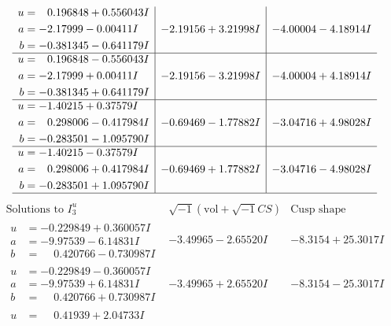 \documentclass[1p]{elsarticle_modified}
\theoremstyle{definition}
\newcommand{\I}{\sqrt{-1}}
\begin{document}
$$\begin{array}{c|c|c}
\begin{aligned}
u &= \phantom{-}0.196848 + 0.556043 I \\
a &= -2.17999 - 0.00411 I \\
b &= -0.381345 - 0.641179 I\end{aligned}
 & -2.19156 + 3.21998 I & -4.00004 - 4.18914 I \\ \hline\begin{aligned}
u &= \phantom{-}0.196848 - 0.556043 I \\
a &= -2.17999 + 0.00411 I \\
b &= -0.381345 + 0.641179 I\end{aligned}
 & -2.19156 - 3.21998 I & -4.00004 + 4.18914 I \\ \hline\begin{aligned}
u &= -1.40215 + 0.37579 I \\
a &= \phantom{-}0.298006 - 0.417984 I \\
b &= -0.283501 - 1.095790 I\end{aligned}
 & -0.69469 - 1.77882 I & -3.04716 + 4.98028 I \\ \hline\begin{aligned}
u &= -1.40215 - 0.37579 I \\
a &= \phantom{-}0.298006 + 0.417984 I \\
b &= -0.283501 + 1.095790 I\end{aligned}
 & -0.69469 + 1.77882 I & -3.04716 - 4.98028 I\\
 \hline 
 \end{array}$$\newpage$$\begin{array}{c|c|c}  
\text{Solutions to }I^u_{3}& \I (\text{vol} + \sqrt{-1}CS) & \text{Cusp shape}\\
 \hline 
\begin{aligned}
u &= -0.229849 + 0.360057 I \\
a &= -9.97539 - 6.14831 I \\
b &= \phantom{-}0.420766 - 0.730987 I\end{aligned}
 & -3.49965 - 2.65520 I & -8.3154 + 25.3017 I \\ \hline\begin{aligned}
u &= -0.229849 - 0.360057 I \\
a &= -9.97539 + 6.14831 I \\
b &= \phantom{-}0.420766 + 0.730987 I\end{aligned}
 & -3.49965 + 2.65520 I & -8.3154 - 25.3017 I \\ \hline\begin{aligned}
u &= \phantom{-}0.41939 + 2.04733 I \\

\end{aligned}
\end{array}$$
\end{document}
